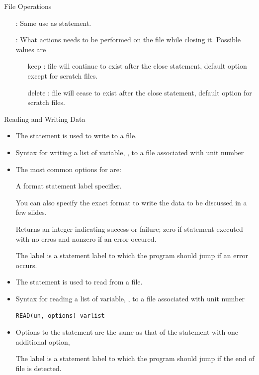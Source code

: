 \documentclass[10pt,t]{beamer}
\begin{document}
\begin{frame}{File Operations}
\begin{itemize}
    \item[] : Same use as  statement.
    \item[] : What actions needs to be performed on the file while closing it. Possible values are
      \begin{itemize}
        \item[keep]: file will continue to exist after the close statement, default option except for scratch files.
        \item[delete]: file will cease to exist after the close statement, default option for scratch files.
      \end{itemize}
  \end{itemize}
\end{frame}

\begin{frame}{Reading and Writing Data}
  \begin{itemize}
    \item The  statement is used to write to a file.
    \item Syntax for writing a list of variable, , to a file associated with unit number  
    \item[] 
    \item The most common options for  are:
    \item[]  A format statement label specifier.
    \item[] You can also specify the exact format to write the data to be discussed in a few slides.
    \item[]  Returns an integer indicating success or failure; zero if statement executed with no erros and nonzero if an error occured.
    \item[]  The label is a statement label to which the program should jump if an error occurs.
    \item The  statement is used to read from a file.
    \item Syntax for reading a list of variable, , to a file associated with unit number 
    \item[] \lstinline[language={[90]Fortran}]|READ(un, options) varlist|
    \item Options to the  statement are the same as that of the  statement with one additional option,
    \item[]  The label is a statement label to which the program should jump if the end of file is detected.
  \end{itemize}
\end{frame}
\end{document}
